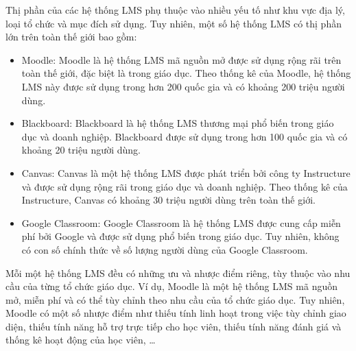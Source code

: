 \documentclass[../Thesis.tex]{subfiles}
\begin{document}
Thị phần của các hệ thống LMS phụ thuộc vào nhiều yếu tố như khu vực địa lý, loại tổ chức và mục đích sử dụng. Tuy nhiên, một số hệ thống LMS có thị phần lớn trên toàn thế giới bao gồm:

\begin{itemize}
    \item Moodle: Moodle là hệ thống LMS mã nguồn mở được sử dụng rộng rãi trên toàn thế giới, đặc biệt là trong giáo dục. Theo thống kê của Moodle, hệ thống LMS này được sử dụng trong hơn 200 quốc gia và có khoảng 200 triệu người dùng.
    \item Blackboard: Blackboard là hệ thống LMS thương mại phổ biến trong giáo dục và doanh nghiệp. Blackboard được sử dụng trong hơn 100 quốc gia và có khoảng 20 triệu người dùng.
    \item Canvas: Canvas là một hệ thống LMS được phát triển bởi công ty Instructure và được sử dụng rộng rãi trong giáo dục và doanh nghiệp. Theo thống kê của Instructure, Canvas có khoảng 30 triệu người dùng trên toàn thế giới.
    \item Google Classroom: Google Classroom là hệ thống LMS được cung cấp miễn phí bởi Google và được sử dụng phổ biến trong giáo dục. Tuy nhiên, không có con số chính thức về số lượng người dùng của Google Classroom.
\end{itemize}

Mỗi một hệ thống LMS đều có những ưu và nhược điểm riêng, tùy thuộc vào nhu cầu của từng tổ chức giáo dục.
Ví dụ, Moodle là một hệ thống LMS mã nguồn mở, miễn phí và có thể tùy chỉnh theo nhu cầu của tổ chức giáo dục. Tuy nhiên, Moodle có một số nhược điểm như thiếu tính linh hoạt trong việc tùy chỉnh giao diện, thiếu tính năng hỗ trợ trực tiếp cho học viên, thiếu tính năng đánh giá và thống kê hoạt động của học viên, …
\end{document}
